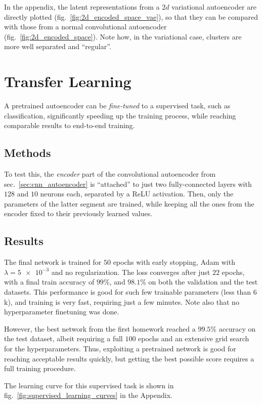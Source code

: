 \documentclass[11pt,a4paper]{scrartcl}
\newcommand{\q}[1]{``#1''}
\begin{document}
In the appendix, the latent representations from a $2d$ variational autoencoder are directly plotted (fig.~\ref{fig:2d_encoded_space_vae}), so that they can be compared with those from a normal convolutional autoencoder (fig.~\ref{fig:2d_encoded_space}). Note how, in the variational case, clusters are more well separated and \q{regular}.

\section{Transfer Learning\label{sec:supervised}}
A pretrained autoencoder can be \textit{fine-tuned} to a supervised task, such as classification, significantly speeding up the training process, while reaching comparable results to end-to-end training.

\subsection{Methods}
To test this, the \textit{encoder} part of the convolutional autoencoder from sec.~\ref{sec:cnn_autoencoder} is \q{attached} to just two fully-connected layers with $128$ and $10$ neurons each, separated by a ReLU activation. Then, only the parameters of the latter segment are trained, while keeping all the ones from the encoder fixed to their previously learned values. 


\subsection{Results}
The final network is trained for $50$ epochs with early stopping, Adam with $\lambda = \num{5e-3}$ and no regularization. The loss converges after just $22$ epochs, with a final train accuracy of $99\%$, and $98.1\%$ on both the validation and the test datasets. This performance is good for such few trainable parameters (less than $6$k), and training is very fast, requiring just a few minutes. Note also that no hyperparameter finetuning was done. 

However, the best network from the first homework reached a $99.5\%$ accuracy on the test dataset, albeit requiring a full $100$ epochs and an extensive grid search for the hyperparameters. Thus, exploiting a pretrained network is good for reaching acceptable results quickly, but getting the best possible score requires a full training procedure. 

\medskip
The learning curve for this supervised task is shown in fig.~\ref{fig:supervised_learning_curves} in the Appendix.
\end{document}
